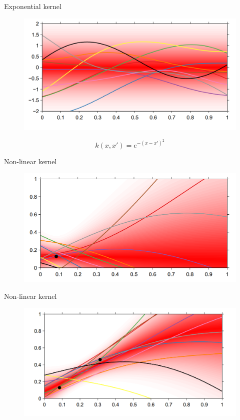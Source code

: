 \documentclass[12pt]{beamer}
\begin{document}
\begin{frame}{Exponential kernel}
\begin{figure}
\includegraphics[scale=0.4]{Bayesian_non_linear_2.png} 
\end{figure}
$$
k(x,x')=e^{-(x-x')^2}
$$
\end{frame}
\begin{frame}{Non-linear kernel}
\begin{figure}
\includegraphics[scale=0.4]{Bayesian_non_linear_3.png} 
\end{figure}
\end{frame}
\begin{frame}{Non-linear kernel}
\begin{figure}
\includegraphics[scale=0.4]{Bayesian_non_linear_4.png} 
\end{figure}
\end{frame}
\end{document}
